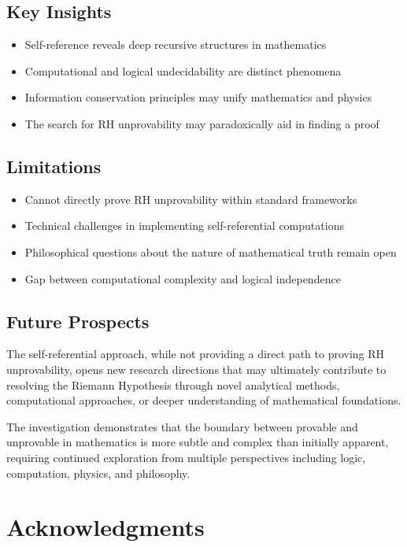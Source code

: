 \documentclass[12pt]{article}
\theoremstyle{plain}
\theoremstyle{definition}
\begin{document}
\subsection{Key Insights}

\begin{itemize}
\item Self-reference reveals deep recursive structures in mathematics
\item Computational and logical undecidability are distinct phenomena
\item Information conservation principles may unify mathematics and physics
\item The search for RH unprovability may paradoxically aid in finding a proof
\end{itemize}

\subsection{Limitations}

\begin{itemize}
\item Cannot directly prove RH unprovability within standard frameworks
\item Technical challenges in implementing self-referential computations
\item Philosophical questions about the nature of mathematical truth remain open
\item Gap between computational complexity and logical independence
\end{itemize}

\subsection{Future Prospects}

The self-referential approach, while not providing a direct path to proving RH unprovability, opens new research directions that may ultimately contribute to resolving the Riemann Hypothesis through novel analytical methods, computational approaches, or deeper understanding of mathematical foundations.

The investigation demonstrates that the boundary between provable and unprovable in mathematics is more subtle and complex than initially apparent, requiring continued exploration from multiple perspectives including logic, computation, physics, and philosophy.

\section*{Acknowledgments}
\end{document}
